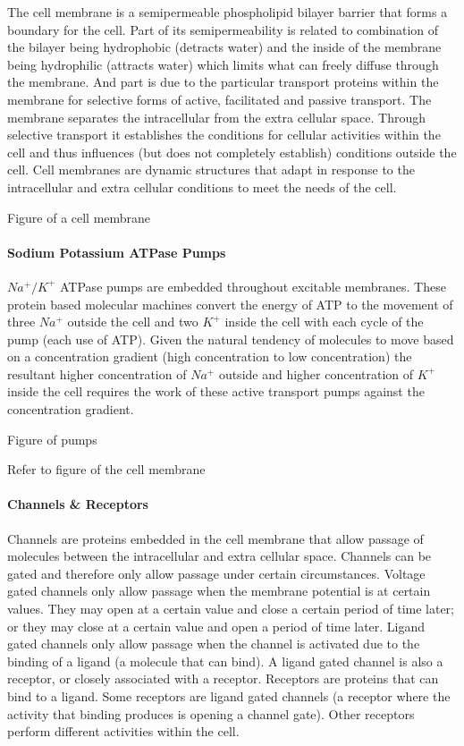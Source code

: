 The cell membrane is a semipermeable phospholipid bilayer barrier that forms a boundary for the cell. Part of its semipermeability is related to combination of the bilayer being hydrophobic (detracts water) and the inside of the membrane being hydrophilic (attracts water) which limits what can freely diffuse through the membrane. And part is due to the particular transport proteins within the membrane for selective forms of active, facilitated and passive transport. The membrane separates the intracellular from the extra cellular space. Through selective transport it establishes the conditions for cellular activities within the cell and thus influences (but does not completely establish) conditions outside the cell. Cell membranes are dynamic structures that adapt in response to the intracellular and extra cellular conditions to meet the needs of the cell.

Figure of a cell membrane

\paragraph{Sodium Potassium ATPase Pumps}
$Na^+/K^+$ ATPase pumps are embedded throughout excitable membranes. These protein based molecular machines convert the energy of ATP to the movement of three $Na^+$ outside the cell and two $K^+$ inside the cell with each cycle of the pump (each use of ATP). Given the natural tendency of molecules to move based on a concentration gradient (high concentration to low concentration) the resultant higher concentration of  $Na^+$ outside and higher concentration of $K^+$ inside the cell requires the work of these active transport pumps against the concentration gradient.

Figure of pumps

Refer to figure of the cell membrane 

\paragraph{Channels \& Receptors}
Channels are proteins embedded in the cell membrane that allow passage of molecules between the intracellular and extra cellular space. Channels can be gated and therefore only allow passage under certain circumstances. 
Voltage gated channels only allow passage when the membrane potential is at certain values. They may open at a certain value and close a certain period of time later; or they may close at a certain value and open a period of time later. 
Ligand gated channels only allow passage when the channel is activated due to the binding of a ligand (a molecule that can bind). A ligand gated channel is also a receptor, or closely associated with a receptor. 
Receptors are proteins that can bind to a ligand. Some receptors are ligand gated channels (a receptor where the activity that binding produces is opening a channel gate). Other receptors perform different activities within the cell. 


